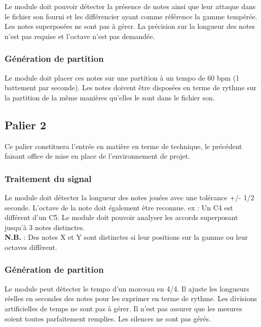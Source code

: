 \documentclass[12pt]{article}
\begin{document}
Le module doit pouvoir détecter la présence de notes ainsi que leur attaque dans le fichier son fourni et les différencier ayant comme référence la gamme tempérée. Les notes superposées ne sont pas à gérer. La précision sur la longueur des notes n'est pas requise et l’octave n’est pas demandée.

\subsubsection{Génération de partition}

Le module doit placer ces notes sur une partition à un tempo de 60 bpm (1 battement par seconde). Les notes doivent être disposées en terme de rythme sur la partition de la même manières qu'elles le sont dans le fichier son.

\newpage
\subsection{Palier 2}

Ce palier constituera l’entrée en matière en terme de technique, le précédent faisant office de mise en place de l’environnement de projet. \\

\subsubsection{Traitement du signal}

Le module doit détecter la longueur des notes jouées avec une tolérance +/- 1/2 seconde. L’octave de la note doit également être reconnue. ex : Un C4 est différent d’un C5. Le module doit pouvoir analyser les accords superposant jusqu’à 3 notes distinctes.\\

\textbf{N.B.} : Des notes X et Y sont distinctes si leur positions sur la gamme ou leur octaves diffèrent.

\subsubsection{Génération de partition}

Le module peut détecter le tempo d’un morceau en 4/4. Il ajuste les longueurs réelles en secondes des notes pour les exprimer en terme de rythme. Les divisions artificielles de temps ne sont pas à gérer. Il n’est pas assurer que les mesures soient toutes parfaitement remplies. Les silences ne sont pas gérés.
\end{document}

